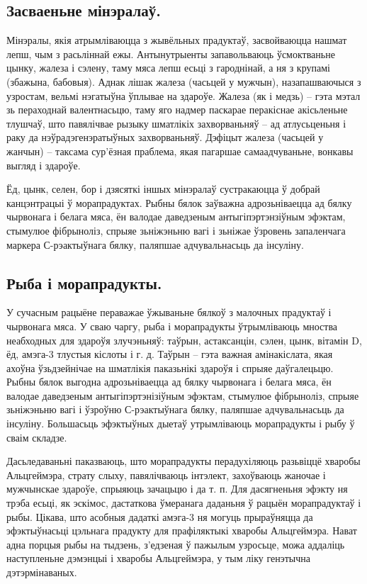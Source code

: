 \subsection{Засваеньне мінэралаў.}
Мінэралы, якія атрымліваюцца з жывёльных прадуктаў, засвойваюцца нашмат лепш, чым з расьліннай ежы. Антынутрыенты запавольваюць ўсмоктваньне цынку, жалеза і сэлену, таму мяса лепш есьці з гароднінай, а ня з крупамі (збажына, бабовыя). Аднак лішак жалеза (часьцей у мужчын), назапашваючыся з узростам, вельмі нэгатыўна ўплывае на здароўе. Жалеза (як і медзь) – гэта мэтал зь пераходнай валентнасьцю, таму яго надмер паскарае перакіснае акісьленьне тлушчаў, што павялічвае рызыку шматлікіх захворваньняў – ад атлусьценьня і раку да нэўрадэгенэратыўных захворваньняў. Дэфіцыт жалеза (часьцей у жанчын) – таксама сур'ёзная праблема, якая пагаршае самаадчуваньне, вонкавы выгляд і здароўе.

Ёд, цынк, селен, бор і дзясяткі іншых мінэралаў сустракаюцца ў добрай канцэнтрацыі ў морапрадуктах. Рыбны бялок заўважна адрозьніваецца ад бялку чырвонага і белага мяса, ён валодае даведзеным антыгіпэртэнзіўным эфэктам, стымулюе фібрыноліз, спрыяе зьніжэньню вагі і зьніжае ўзровень запаленчага маркера С-рэактыўнага бялку, паляпшае адчувальнасьць да інсуліну.

\subsection{Рыба і морапрадукты.}
У сучасным рацыёне пераважае ўжываньне бялкоў з малочных прадуктаў і чырвонага мяса. У сваю чаргу, рыба і морапрадукты ўтрымліваюць мноства неабходных для здароўя злучэньняў: таўрын, астаксанцін, сэлен, цынк, вітамін D, ёд, амэга-3 тлустыя кіслоты і г. д. Таўрын – гэта важная амінакіслата, якая ахоўна ўзьдзейнічае на шматлікія паказьнікі здароўя і спрыяе даўгалецьцю. Рыбны бялок выгодна адрозьніваецца ад бялку чырвонага і белага мяса, ён валодае даведзеным антыгіпэртэнізіўным эфэктам, стымулюе фібрыноліз, спрыяе зьніжэньню вагі і ўзроўню С-рэактыўнага бялку, паляпшае адчувальнасьць да інсуліну. Большасьць эфэктыўных дыетаў утрымліваюць морапрадукты і рыбу ў сваім складзе.

Дасьледаваньні паказваюць, што морапрадукты перадухіляюць разьвіццё хваробы Альцгеймэра, страту слыху, павялічваюць інтэлект, захоўваюць жаночае і мужчынскае здароўе, спрыяюць зачацьцю і да т. п. Для дасягненьня эфэкту ня трэба есьці, як эскімос, дастаткова ўмеранага даданьня ў рацыён морапрадуктаў і рыбы. Цікава, што асобныя дадаткі амэга-3 ня могуць прыраўняцца да эфэктыўнасьці цэльнага прадукту для прафіляктыкі хваробы Альцгеймэра. Нават адна порцыя рыбы на тыдзень, з'едзеная ў пажылым узросьце, можа аддаліць наступленьне дэмэнцыі і хваробы Альцгеймэра, у тым ліку генэтычна дэтэрмінаваных.


